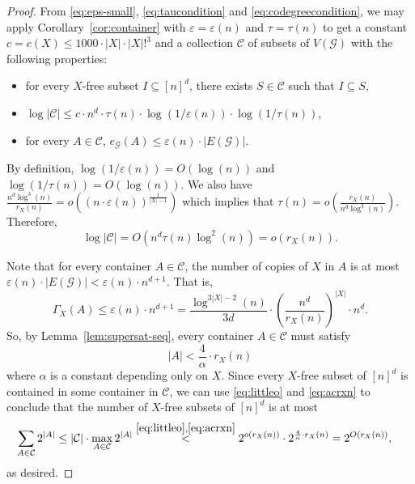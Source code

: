\documentclass[12pt]{article}
\numberwithin{equation}{section}
\theoremstyle{definition}
\theoremstyle{remark}
\begin{document}
\begin{proof}
From \eqref{eq:eps-small}, \eqref{eq:taucondition} and \eqref{eq:codegreecondition}, we may apply Corollary~\ref{cor:container} with $\varepsilon = \varepsilon(n)$ and $\tau = \tau(n)$ to get a constant $c = c(X) \leq 1000\cdot |X| \cdot |X|!^3$ and a collection $\mathcal{C}$ of subsets of $V(\mathcal{G})$ with the following properties:
\begin{itemize}
    \item for every $X$-free subset $I \subseteq [n]^d$, there exists $S \in \mathcal{C}$ such that $I \subseteq S$,  
    \item $\log|\mathcal{C}| \leq c \cdot n^d \cdot \tau(n) \cdot \log(1/\varepsilon(n)) \cdot \log(1/\tau(n))$,
    \item for every $A \in \mathcal{C}$, $e_\mathcal{G}(A) \leq \varepsilon(n) \cdot |E(\mathcal{G})|.$
\end{itemize}

By definition, $\log(1/\varepsilon(n)) = O(\log(n))$ and $\log(1/\tau(n))=O(\log(n))$. We also have $\frac{n^d \log^3 (n)}{r_X(n)} = o\left((n\cdot \varepsilon(n))^{\frac{1}{|X|-1}}\right)$ which implies that $\tau(n)=o\left( \frac{r_X(n)}{n^d\log^3(n)}\right)$. Therefore,
\begin{equation}\label{eq:littleo}\log|\mathcal{C}|=O\left(n^d\tau(n)\log^2(n)\right) = o(r_X(n)).\end{equation}





Note that for every container $A \in \mathcal{C}$, the number of copies of $X$ in $A$ is at most 
$\varepsilon(n)\cdot |E(\mathcal{G})| < \varepsilon(n)\cdot n^{d+1}$. That is,
\[\Gamma_X(A)\leq \varepsilon(n)\cdot n^{d+1} = \frac{\log^{3|X|-2}(n)}{3d}\cdot\left(\frac{n^d}{r_X(n)}\right)^{|X|}\cdot n^d.\]
So, by Lemma~\ref{lem:supersat-seq}, every container $A \in \mathcal{C}$ must satisfy 
\begin{equation}\label{eq:acrxn}|A|<\frac{4}{\alpha}\cdot r_X(n)\end{equation} 
where $\alpha$ is a constant depending only on $X$. Since every $X$-free subset of $[n]^d$ is contained in some container in $\mathcal{C}$, we can use \eqref{eq:littleo} and \eqref{eq:acrxn} to conclude that the number of $X$-free subsets of $[n]^d$ is at most \begin{align*}\sum_{A\in \mathcal{C}}2^{|A|} & \leq |\mathcal{C}|\cdot\max_{A\in \mathcal{C}}2^{|A|}
\overset{\eqref{eq:littleo},\eqref{eq:acrxn}}{<} 2^{o(r_X(n))}\cdot2^{\frac{4}{\alpha}\cdot r_X(n)} = 2^{O(r_X(n))},\end{align*} as desired.
\end{proof} 


\end{document}
